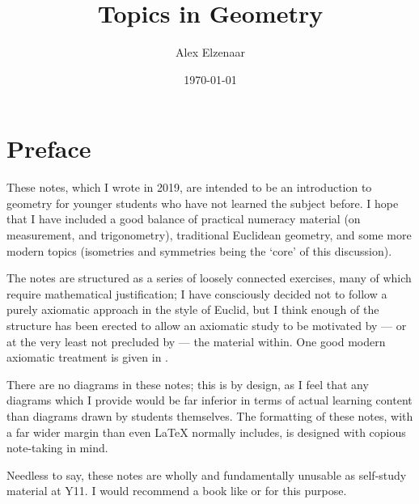 \documentclass[a4paper]{report}
\title{Topics in Geometry}
\author{Alex Elzenaar}
\date{\today}
\theoremstyle{definition}
\begin{document}
  \maketitle

  \clearpage
  \thispagestyle{plain}
  \par{}

  \tableofcontents

  \clearpage
  \chapter*{Preface}
  These notes, which I wrote in 2019, are intended to be an introduction to geometry for younger students who have not learned the subject
  before. I hope that I have included a good balance of practical numeracy material (on measurement, and trigonometry), traditional Euclidean geometry,
  and some more modern topics (isometries and symmetries being the `core' of this discussion).

  The notes are structured as a series of loosely connected exercises, many of which require mathematical justification; I have consciously
  decided not to follow a purely axiomatic approach in the style of Euclid, but I think enough of the structure has been erected to allow
  an axiomatic study to be motivated by --- or at the very least not precluded by --- the material within. One good modern axiomatic treatment
  is given in \autocite{lee}.

  There are no diagrams in these notes; this is by design, as I feel that any diagrams which I provide would be far inferior in terms of actual
  learning content than diagrams drawn by students themselves. The formatting of these notes, with a far wider margin than even \LaTeX{} normally
  includes, is designed with copious note-taking in mind.

  Needless to say, these notes are wholly and fundamentally unusable as self-study material at Y11. I would recommend a book like \autocite{lang}
  or \autocite{birkhoff} for this purpose.
\end{document}
